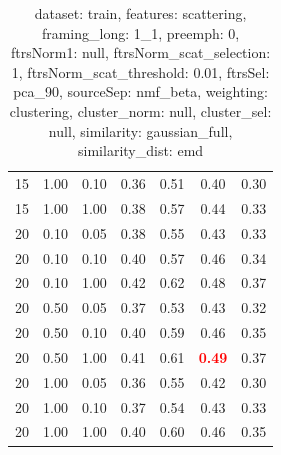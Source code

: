 \begin{table}
\begin{center}
\begin{tabular}{lllcccc}
15 & 1.00 & 0.10 & 0.36 & 0.51 & 0.40 & 0.30 \\ 
15 & 1.00 & 1.00 & 0.38 & 0.57 & 0.44 & 0.33 \\ 
20 & 0.10 & 0.05 & 0.38 & 0.55 & 0.43 & 0.33 \\ 
20 & 0.10 & 0.10 & 0.40 & 0.57 & 0.46 & 0.34 \\ 
20 & 0.10 & 1.00 & 0.42 & 0.62 & 0.48 & 0.37 \\ 
20 & 0.50 & 0.05 & 0.37 & 0.53 & 0.43 & 0.32 \\ 
20 & 0.50 & 0.10 & 0.40 & 0.59 & 0.46 & 0.35 \\ 
20 & 0.50 & 1.00 & 0.41 & 0.61 & \textbf{\textcolor{red}{0.49}} & 0.37 \\ 
20 & 1.00 & 0.05 & 0.36 & 0.55 & 0.42 & 0.30 \\ 
20 & 1.00 & 0.10 & 0.37 & 0.54 & 0.43 & 0.33 \\ 
20 & 1.00 & 1.00 & 0.40 & 0.60 & 0.46 & 0.35 \\ 
\end{tabular} 
\end{center} 
\caption{dataset: train, features: scattering, framing\_long: 1\_1, preemph: 0, ftrsNorm1: null, ftrsNorm\_scat\_selection: 1, ftrsNorm\_scat\_threshold: 0.01, ftrsSel: pca\_90, sourceSep: nmf\_beta, weighting: clustering, cluster\_norm: null, cluster\_sel: null, similarity: gaussian\_full, similarity\_dist: emd} 
\label{datasetrFeaturscFraminlong1_1Preemp0Ftrsnorm1nuFtrsnoscatselect1Ftrsnoscatthresh0.01Ftrsselpc90SourcesepnmbeWeightclClustenormnuClusteselnuSimilagafuSimiladistem} 
\end{table} 
 
